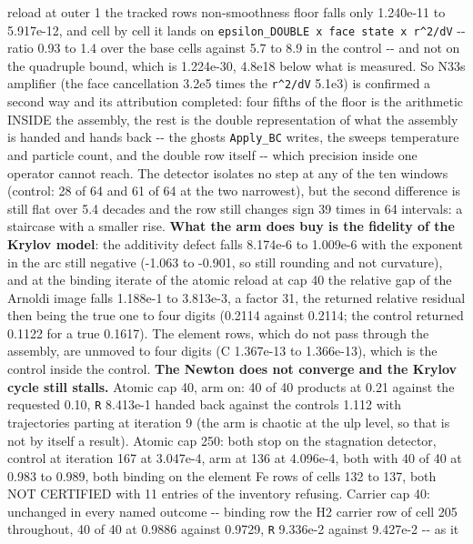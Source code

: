 \documentclass[english,a4paper]{my_memo}
\begin{document}
\begin{itemize}
  reload at outer 1 the tracked row\textquotesingle s non-smoothness floor falls only
  1.240e-11 to 5.917e-12, and cell by cell it lands on
  \texttt{epsilon\_DOUBLE\ x\ face\ state\ x\ r\^{}2/dV} -\/- ratio 0.93 to 1.4 over the base
  cells against 5.7 to 8.9 in the control -\/- and not on the quadruple
  bound, which is 1.224e-30, 4.8e18 below what is measured. So N33\textquotesingle s
  amplifier (the face cancellation 3.2e5 times the \texttt{r\^{}2/dV} 5.1e3) is
  confirmed a second way and its attribution completed: four fifths of the
  floor is the arithmetic INSIDE the assembly, the rest is the double
  representation of what the assembly is handed and hands back -\/- the
  ghosts \texttt{Apply\_BC} writes, the sweep\textquotesingle s temperature and particle count,
  and the double row itself -\/- which precision inside one operator cannot
  reach. The detector isolates no step at any of the ten windows (control:
  28 of 64 and 61 of 64 at the two narrowest), but the second difference is
  still flat over 5.4 decades and the row still changes sign 39 times in
  64 intervals: a staircase with a smaller rise. \textbf{What the arm does buy
  is the fidelity of the Krylov model}: the additivity defect falls
  8.174e-6 to 1.009e-6 with the exponent in the arc still negative
  (-1.063 to -0.901, so still rounding and not curvature), and at the
  binding iterate of the atomic reload at cap 40 the relative gap of the
  Arnoldi image falls 1.188e-1 to 3.813e-3, a factor 31, the returned
  relative residual then being the true one to four digits (0.2114 against
  0.2114; the control returned 0.1122 for a true 0.1617). The element rows,
  which do not pass through the assembly, are unmoved to four digits
  (C 1.367e-13 to 1.366e-13), which is the control inside the control.
  \textbf{The Newton does not converge and the Krylov cycle still stalls.}
  Atomic cap 40, arm on: 40 of 40 products at 0.21 against the requested
  0.10, \texttt{\textbar{}\textbar{}R\textbar{}\textbar{}} 8.413e-1 handed back against the control\textquotesingle s 1.112 with
  trajectories parting at iteration 9 (the arm is chaotic at the ulp level,
  so that is not by itself a result). Atomic cap 250: both stop on the
  stagnation detector, control at iteration 167 at 3.047e-4, arm at 136 at
  4.096e-4, both with 40 of 40 at 0.983 to 0.989, both binding on the
  element Fe rows of cells 132 to 137, both NOT CERTIFIED with 11 entries
  of the inventory refusing. Carrier cap 40: unchanged in every named
  outcome -\/- binding row the H2 carrier row of cell 205 throughout, 40 of
  40 at 0.9886 against 0.9729, \texttt{\textbar{}\textbar{}R\textbar{}\textbar{}} 9.336e-2 against 9.427e-2 -\/- as it

\end{itemize}
\end{document}
